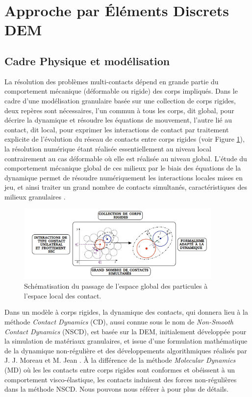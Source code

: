 \section{Approche par Éléments Discrets DEM}\label{DEM_approach}

\subsection{Cadre Physique et modélisation}

La résolution des problèmes multi-contacts dépend en grande partie du comportement mécanique (déformable ou rigide) des corps impliqués. Dans le cadre d’une modélisation granulaire basée sur une collection de corps rigides, deux repères sont nécessaires, l’un commun à tous les corps, dit global, pour décrire la dynamique et résoudre les équations de mouvement, l’autre lié au contact, dit local, pour exprimer les interactions de contact par traitement explicite de l'évolution du réseau de contacts entre corps rigides (voir Figure \ref{fig31}), la résolution numérique étant réalisée
essentiellement au niveau local contrairement au cas déformable où elle est réalisée
au niveau global. L'étude du comportement mécanique global de ces milieux par le biais des équations de la dynamique permet de résoudre numériquement les interactions locales mises en jeu, et ainsi traiter un grand nombre de contacts simultanés, caractéristiques des milieux granulaires \cite{alart2015dynamique}.

\begin{figure}[!h]
  \centering
    \includegraphics[width=0.9\textwidth]{chapitres/chapitre_3/figures/global_local_schema.png}
    \caption{\centering Schématisation du passage de l'espace global des particules à l'espace local des contact.}\label{fig31}
\end{figure}

Dans un modèle à corps rigides, la dynamique des contacts, qui donnera lieu à la méthode \textit{Contact Dynamics} (CD), aussi connue sous le nom de \textit{Non-Smooth Contact Dynamics} (NSCD), est basée sur la DEM, initialement développée pour la simulation de matériaux granulaires, et issue d'une formulation mathématique de la dynamique non-régulière et des développements algorithmiques réalisés par J. J. Moreau et M. Jean \cite{jean1992unilaterality, moreau1977application, moreau1988unilateral, moreau1994numerical, moreau1999sweeping}. À la différence de la méthode \textit{Molecular Dynamics} (MD) où les les contacts entre corps rigides sont conformes et obéissent à un comportement visco-élastique, les contacts induisent des forces non-régulières dans la méthode NSCD. Nous pouvons nous référer à \cite{radjai2009contact} pour plus de détails. 

